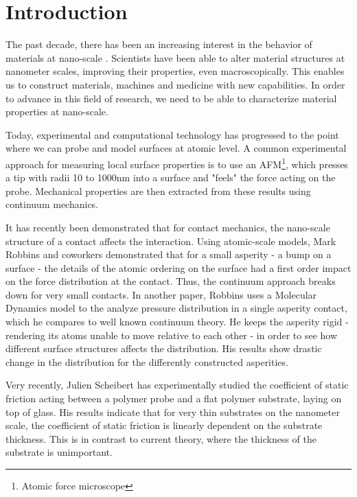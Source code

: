 \documentclass[twoside,english]{uiofysmaster}
\begin{document}
\chapter{Introduction}

The past decade, there has been an increasing interest in the behavior of materials at nano-scale \cite{nanoOnReflection}.
Scientists have been able to alter material structures at nanometer scales, improving their properties, even macroscopically.
This enables us to construct materials, machines and medicine with new capabilities.   
In order to advance in this field of research, we need to be able to characterize material properties at nano-scale.

Today, experimental and computational technology has progressed to the point where we can probe and model surfaces at atomic level.
A common experimental approach for measuring local surface properties is to use an AFM\footnote{Atomic force microscope},
which presses a tip with radii 10 to 1000nm into a surface and "feels" the force acting on the probe. 
Mechanical properties are then extracted from these results using continuum mechanics.

It has recently been demonstrated that for contact mechanics, the nano-scale
structure of a contact affects the interaction. 
Using atomic-scale models, Mark Robbins and coworkers \cite{Robbins2005} demonstrated that for a small asperity - a bump on a surface - the details of the atomic ordering on the surface had a first order impact on the force distribution at the contact. 
Thus, the continuum approach breaks down for very small contacts.
In another paper, Robbins \cite{RobbinsSingleAsperity} uses a Molecular Dynamics model to the analyze pressure distribution in a single asperity contact, which he compares to well known continuum theory. He keeps the asperity rigid - rendering its atoms unable to move relative to each other - in order to see how different surface structures affects the distribution. His results show drastic change in the distribution for the differently constructed asperities.   


Very recently, Julien Scheibert \cite{Scheibert2017} has experimentally studied the coefficient of static friction  acting between a polymer probe and a flat polymer substrate, laying on top of glass. 
His results indicate that for very thin substrates on the nanometer scale, the coefficient of static friction is linearly dependent on the substrate thickness. 
This is in contrast to current theory, where the thickness of the substrate is unimportant. 
\end{document}

